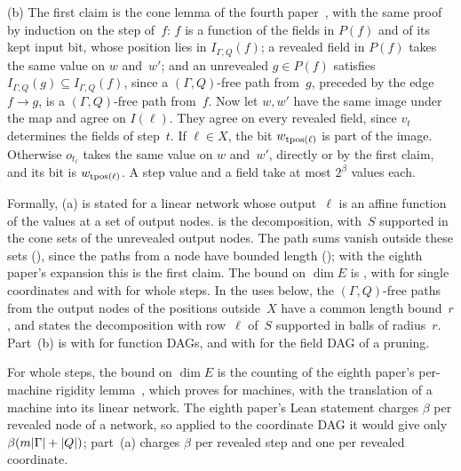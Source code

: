 \begin{outline}
(b) The first claim is the cone lemma of the fourth paper~\cite[Lemma~4.4 and Remark~4.6]{FourthPaper2026}, with the same
proof by induction on the step of~$f$: $f$ is a function of the fields in $P(f)$ and of its kept input bit, whose
position lies in $I_{\Gamma,Q}(f)$; a revealed field in $P(f)$ takes the same value on $w$ and~$w'$; and an unrevealed
$g\in P(f)$ satisfies $I_{\Gamma,Q}(g)\subseteq I_{\Gamma,Q}(f)$, since a $(\Gamma,Q)$-free path from~$g$, preceded by the
edge $f\to g$, is a $(\Gamma,Q)$-free path from~$f$. Now let $w,w'$ have the same image under the map and agree on
$I(\ell)$. They agree on every revealed field, since $v_t$ determines the fields of step~$t$. If $\ell\in X$, the bit
$w_{\operatorname{tpos}(\ell)}$ is part of the image. Otherwise $o_{t_\ell}$ takes the same value on $w$ and~$w'$, directly or by the
first claim, and its bit is $w_{\operatorname{tpos}(\ell)}$. A step value and a field take at most $2^\beta$ values each.

Formally, (a) is stated for a linear network whose output~$\ell$ is an affine function of the values at a set of output
nodes.  is the decomposition, with~$S$ supported in the cone sets 
of the unrevealed output nodes. The path sums vanish outside these sets (),
since the paths from a node have bounded length (); with the eighth paper's
expansion  this is the first claim. The bound on $\dim E$ is
, with  for single coordinates and
 with  for whole steps. In the
uses below, the $(\Gamma,Q)$-free paths from the output nodes of the positions outside~$X$ have a common length
bound~$r$, and  states the decomposition with row~$\ell$ of~$S$ supported in balls of
radius~$r$. Part~(b) is  with  for function DAGs, and
 with  for the field DAG of a pruning.
\end{outline}

For whole steps, the bound on $\dim E$ is the counting of the eighth paper's per-machine rigidity
lemma~\cite[Lemma~7.3]{BoundedNesting2026}, which  proves for machines,
with the translation of a machine into its linear network. The eighth paper's Lean statement charges $\beta$ per
revealed node of a network, so applied to the coordinate DAG it would give only $\beta(m\lvert \Gamma \rvert+\lvert Q \rvert)$; part~(a)
charges $\beta$ per revealed step and one per revealed coordinate.

